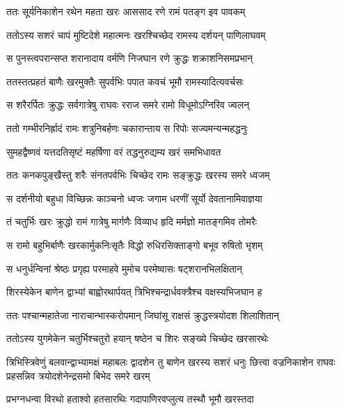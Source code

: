 \twolineshloka
{ततः सूर्यनिकाशेन रथेन महता खरः}
{आससाद रणे रामं पतङ्ग इव पावकम्} %

\twolineshloka
{ततोऽस्य सशरं चापं मुष्टिदेशे महात्मनः}
{खरश्चिच्छेद रामस्य दर्शयन् पाणिलाघवम्} %

\twolineshloka
{स पुनस्त्वपरान्सप्त शरानादाय वर्मणि}
{निजघान रणे क्रुद्धः शक्राशनिसमप्रभान्} %

\twolineshloka
{ततस्तत्प्रहतं बाणैः खरमुक्तैः सुपर्वभिः}
{पपात कवचं भूमौ रामस्यादित्यवर्चसः} %

\twolineshloka
{स शरैरर्पितः क्रुद्धः सर्वगात्रेषु राघवः}
{रराज समरे रामो विधूमोऽग्निरिव ज्वलन्} %

\twolineshloka
{ततो गम्भीरनिर्ह्रादं रामः शत्रुनिबर्हणः}
{चकारान्ताय स रिपोः सज्यमन्यन्महद्धनुः} %

\twolineshloka
{सुमहद्वैष्णवं यत्तदतिसृष्टं महर्षिणा}
{वरं तद्धनुरुद्यम्य खरं समभिधावत} %

\twolineshloka
{ततः कनकपुङ्खैस्तु शरैः संनतपर्वभिः}
{चिच्छेद रामः सङ्क्रुद्धः खरस्य समरे ध्वजम्} %

\twolineshloka
{स दर्शनीयो बहुधा विच्छिन्नः काञ्चनो ध्वजः}
{जगाम धरणीं सूर्यो देवतानामिवाज्ञया} %

\twolineshloka
{तं चतुर्भिः खरः क्रुद्धो रामं गात्रेषु मार्गणैः}
{विव्याध हृदि मर्मज्ञो मातङ्गमिव तोमरैः} %

\twolineshloka
{स रामो बहुभिर्बाणैः खरकार्मुकनिःसृतैः}
{विद्धो रुधिरसिक्ताङ्गो बभूव रुषितो भृशम्} %

\twolineshloka
{स धनुर्धन्विनां श्रेष्ठः प्रगृह्य परमाहवे}
{मुमोच परमेष्वासः षट्शरानभिलक्षितान्} %

\twolineshloka
{शिरस्येकेन बाणेन द्वाभ्यां बाह्वोरथार्पयत्}
{त्रिभिश्चन्द्रार्धवक्त्रैश्च वक्षस्यभिजघान ह} %

\twolineshloka
{ततः पश्चान्महातेजा नाराचान्भास्करोपमान्}
{जिघांसू राक्षसं क्रुद्धस्त्रयोदश शिलाशितान्} %

\twolineshloka
{ततोऽस्य युगमेकेन चतुर्भिश्चतुरो हयान्}
{षष्ठेन च शिरः सङ्ख्ये चिच्छेद खरसारथेः} %

\fourlineshloka
{त्रिभिस्त्रिवेणुं बलवान्द्वाभ्यामक्षं महाबलः}
{द्वादशेन तु बाणेन खरस्य सशरं धनुः}
{छित्त्वा वज्रनिकाशेन राघवः प्रहसन्निव}
{त्रयोदशेनेन्द्रसमो बिभेद समरे खरम्} %

\twolineshloka
{प्रभग्नधन्वा विरथो हताश्वो हतसारथिः}
{गदापाणिरवप्लुत्य तस्थौ भूमौ खरस्तदा} %


